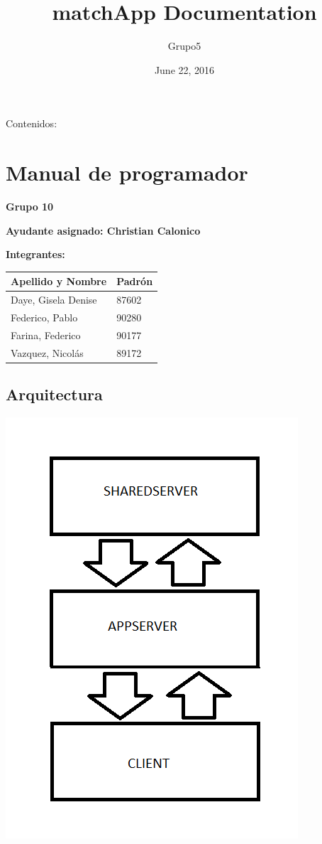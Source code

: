\documentclass[letterpaper,10pt,english]{sphinxmanual}
\title{matchApp Documentation}
\date{June 22, 2016}
\author{Grupo5}
\begin{document}
\maketitle
\tableofcontents
{}\label{index::doc}


Contenidos:


\chapter{Manual de programador}
\label{manuals:manual-de-programador}\label{manuals::doc}\label{manuals:documentacion-de-matchapp}
\textbf{Grupo 10}

\textbf{Ayudante asignado: Christian Calonico}

\textbf{Integrantes:}

\begin{tabulary}{\linewidth}{|L|L|}
\hline
\textsf{\relax 
Apellido y Nombre
} & \textsf{\relax 
Padrón
}\\
\hline
Daye, Gisela Denise
 & 
87602
\\
\hline
Federico, Pablo
 & 
90280
\\
\hline
Farina, Federico
 & 
90177
\\
\hline
Vazquez, Nicolás
 & 
89172
\\
\hline\end{tabulary}



\section{Arquitectura}
\label{manuals:arquitectura}
\includegraphics{architecture.png}
\end{document}
